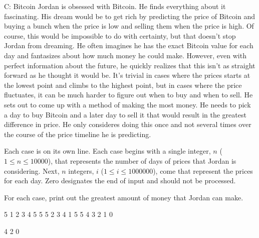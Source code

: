 \begin{problem}{C: Bitcoin}
Jordan is obsessed with Bitcoin.
He finds everything about it fascinating. 
His dream would be to get rich by predicting the price of Bitcoin and buying a bunch when the price is low and selling them when the price is high.
Of course, this would be impossible to do with certainty, but that doesn't stop Jordan from dreaming.
He often imagines he has the exact Bitcoin value for each day and fantasizes about how much money he could make.
However, even with perfect information about the future, he quickly realizes that this isn't as straight forward as he thought it would be.
It's trivial in cases where the prices starts at the lowest point and climbs to the highest point, but in cases where the price fluctuates, it can be much harder to figure out when to buy and when to sell. 
He sets out to come up with a method of making the most money. 
He needs to pick a day to buy Bitcoin and a later day to sell it that would result in the greatest difference in price.
He only consideres doing this once and not several times over the course of the price timeline he is predicting.
\end{problem}

\begin{formalin}
Each case is on its own line.
Each case begins with a single integer, $n$ ($1 \leq n \leq 10000$), that represents the number of days of prices that Jordan is considering. 
Next, $n$ integers, $i$ ($1 \leq i \leq 1000000$), come that represent the prices for each day.
Zero designates the end of input and should not be processed.
\end{formalin}

\begin{formalout}
For each case, print out the greatest amount of money that Jordan can make.
\end{formalout}

\begin{datain}
5 1 2 3 4 5
5 5 2 3 4 1
5 5 4 3 2 1
0
\end{datain}

\begin{dataout}
4
2
0
\end{dataout}

